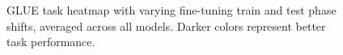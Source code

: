 \begin{figure}
    \centering
    \caption{GLUE task heatmap with varying fine-tuning train and test phase shifts, averaged across all models. Darker colors represent better task performance.}
    \label{fig:glue_phaseshift}
\end{figure}
